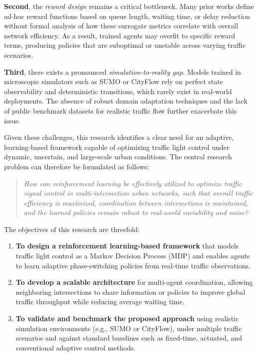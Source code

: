\documentclass[12pt]{report} %
\begin{document}
\textbf{Second}, the \textit{reward design} remains a critical bottleneck. Many prior works define ad-hoc reward functions based on queue length, waiting time, or delay reduction without formal analysis of how these surrogate metrics correlate with overall network efficiency. As a result, trained agents may overfit to specific reward terms, producing policies that are suboptimal or unstable across varying traffic scenarios.

\textbf{Third}, there exists a pronounced \textit{simulation-to-reality gap}. Models trained in microscopic simulators such as SUMO or CityFlow rely on perfect state observability and deterministic transitions, which rarely exist in real-world deployments. The absence of robust domain adaptation techniques and the lack of public benchmark datasets for realistic traffic flow further exacerbate this issue.

Given these challenges, this research identifies a clear need for an adaptive, learning-based framework capable of optimizing traffic light control under dynamic, uncertain, and large-scale urban conditions. The central research problem can therefore be formulated as follows:

\begin{quote}
    \textit{How can reinforcement learning be effectively utilized to optimize traffic signal control in multi-intersection urban networks, such that overall traffic efficiency is maximized, coordination between intersections is maintained, and the learned policies remain robust to real-world variability and noise?}
\end{quote}

The objectives of this research are threefold:
\begin{enumerate}
    \item \textbf{To design a reinforcement learning-based framework} that models traffic light control as a Markov Decision Process (MDP) and enables agents to learn adaptive phase-switching policies from real-time traffic observations.
    \item \textbf{To develop a scalable architecture} for multi-agent coordination, allowing neighboring intersections to share information or policies to improve global traffic throughput while reducing average waiting time.
    \item \textbf{To validate and benchmark the proposed approach} using realistic simulation environments (e.g., SUMO or CityFlow), under multiple traffic scenarios and against standard baselines such as fixed-time, actuated, and conventional adaptive control methods.
\end{enumerate}
\end{document}
